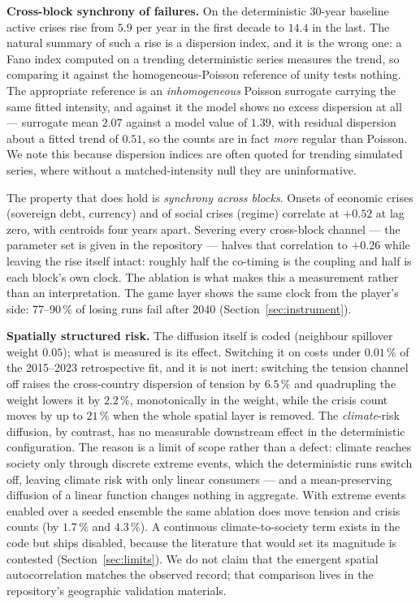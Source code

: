 \documentclass[a4paper,fleqn]{cas-sc}
\begin{document}
\textbf{Cross-block synchrony of failures.} On the deterministic 30-year baseline active crises
rise from $5.9$ per year in the first decade to $14.4$ in the last. The natural summary of such a
rise is a dispersion index, and it is the wrong one: a Fano index computed on a trending
deterministic series measures the trend, so comparing it against the homogeneous-Poisson
reference of unity tests nothing. The appropriate reference is an \emph{inhomogeneous} Poisson
surrogate carrying the same fitted intensity, and against it the model shows no excess dispersion
at all --- surrogate mean $2.07$ against a model value of $1.39$, with residual dispersion about
a fitted trend of $0.51$, so the counts are in fact \emph{more} regular than Poisson. We note
this because dispersion indices are often quoted for trending simulated series, where without a
matched-intensity null they are uninformative.

The property that does hold is \emph{synchrony across blocks}. Onsets of economic crises
(sovereign debt, currency) and of social crises (regime) correlate at $+0.52$ at lag zero, with
centroids four years apart. Severing every cross-block channel --- the parameter set is given in
the repository --- halves that correlation to $+0.26$ while leaving the rise itself intact:
roughly half the co-timing is the coupling and half is each block's own clock. The ablation is
what makes this a measurement rather than an interpretation. The game layer shows
the same clock from the player's side: 77--90\,\% of losing runs fail after 2040
(Section~\ref{sec:instrument}).

\textbf{Spatially structured risk.} The diffusion itself is coded (neighbour spillover weight
$0.05$); what is measured is its effect. Switching it on costs under $0.01\,\%$ of the
2015--2023 retrospective fit, and it is not inert: switching the tension channel off raises the
cross-country dispersion of tension by $6.5\,\%$ and quadrupling the weight lowers it by
$2.2\,\%$, monotonically in the weight, while the crisis count moves by up to $21\,\%$ when the
whole spatial layer is removed. The \emph{climate}-risk diffusion, by contrast, has no
measurable downstream effect in the deterministic configuration. The reason is a limit of scope
rather than a defect: climate reaches society only through discrete
extreme events, which the deterministic runs switch off, leaving climate risk with only linear
consumers --- and a mean-preserving diffusion of a linear function changes nothing in aggregate.
With extreme events enabled over a seeded ensemble the same ablation does move tension and
crisis counts (by $1.7\,\%$ and $4.3\,\%$). A continuous climate-to-society term exists in the
code but ships disabled, because the literature that would set its magnitude is contested
(Section~\ref{sec:limits}). We do not claim that the emergent spatial autocorrelation matches
the observed record; that comparison lives in the repository's geographic validation materials.
\end{document}
